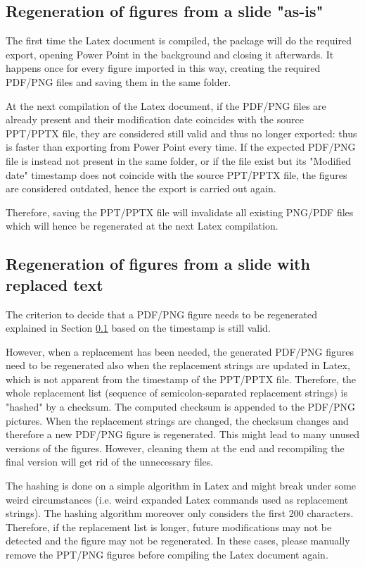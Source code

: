 \documentclass[10pt,,a4paper]{article}
\begin{document}
\subsection{Regeneration of figures from a slide "as-is"}\label{ss:regenerateasis}
The first time the Latex document is compiled, the package will do the required export, opening Power Point in the background and closing it afterwards.
It happens once for every figure imported in this way, creating the required PDF/PNG files and saving them in the same folder.

At the next compilation of the Latex document, if the PDF/PNG files are already present and their modification date coincides with the source PPT/PPTX file, they are considered still valid and thus no longer exported: thus is faster than exporting from Power Point every time.
If the expected PDF/PNG file is instead not present in the same folder, or if the file exist but its "Modified date" timestamp does not coincide with the source PPT/PPTX file, the figures are considered outdated, hence the export is carried out again.

Therefore, saving the PPT/PPTX file will invalidate all existing PNG/PDF files which will hence be regenerated at the next Latex compilation.

\subsection{Regeneration of figures from a slide with replaced text}
The criterion to decide that a PDF/PNG figure needs to be regenerated explained in Section \ref{ss:regenerateasis} based on the timestamp is still valid.

However, when a replacement has been needed, the generated PDF/PNG figures need to be regenerated also when the replacement strings are updated in Latex, which is not apparent from the timestamp of the PPT/PPTX file.
Therefore, the whole replacement list (sequence of semicolon-separated replacement strings) is "hashed" by a checksum.
The computed checksum is appended to the PDF/PNG pictures.
When the replacement strings are changed, the checksum changes and therefore a new PDF/PNG figure is regenerated.
This might lead to many unused versions of the figures. However, cleaning them at the end and recompiling the final version will get rid of the unnecessary files.

The hashing is done on a simple algorithm in Latex and might break under some weird circumstances (i.e. weird expanded Latex commands used as replacement strings).
The hashing algorithm moreover only considers the first 200 characters.
Therefore, if the replacement list is longer, future modifications may not be detected and the figure may not be regenerated.
In these cases, please manually remove the PPT/PNG figures before compiling the Latex document again.
\end{document}
